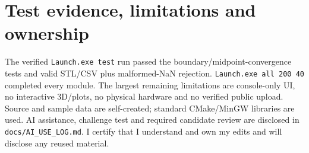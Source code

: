\documentclass[10pt]{article}
\begin{document}
\section*{Test evidence, limitations and ownership}
The verified \texttt{Launch.exe test} run passed the boundary/midpoint-convergence tests and valid STL/CSV plus malformed-NaN rejection. \texttt{Launch.exe all 200 40} completed every module. The largest remaining limitations are console-only UI, no interactive 3D/plots, no physical hardware and no verified public upload. Source and sample data are self-created; standard CMake/MinGW libraries are used. AI assistance, challenge test and required candidate review are disclosed in \texttt{docs/AI\_USE\_LOG.md}. I certify that I understand and own my edits and will disclose any reused material.
\end{document}
